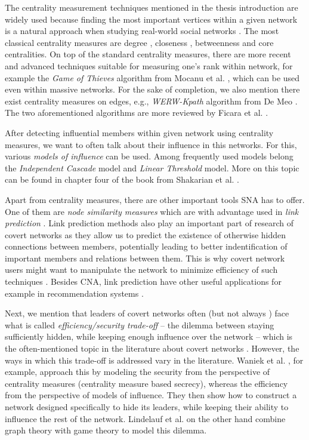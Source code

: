 The centrality measurement techniques mentioned in the thesis introduction are widely used because
finding the most important vertices within a given network is a natural approach when
studying real-world social networks \cite{Crescenzi2016}.
The most classical centrality measures are degree \cite{Shaw1954}, closeness \cite{Beauchamp1965},
betweenness \cite{Anthonisse1971,Freeman1977} and core \cite{Seidman1983} centralities.
On top of the standard centrality measures, there are more recent and advanced techniques suitable for measuring one's rank within network,
for example the \emph{Game of Thieves} algorithm from Mocanu et al. \cite{Mocanu2018}, which can be used even within massive networks.
For the sake of completion, we also mention there exist centrality measures on edges, e.g.,
\emph{WERW-Kpath} algorithm from {De Meo} \cite{DeMeo2013}.
The two aforementioned algorithms are more reviewed by Ficara et al. \cite{Ficara2021}.

After detecting influential members within given network using centrality measures,
we want to often talk about their influence in this networks.
For this, various \emph{models of influence} can be used.
Among frequently used models belong the \emph{Independent Cascade} model and \emph{Linear Threshold} model.
More on this topic can be found in chapter four of the book from Shakarian et al. \cite{Shakarian2015}.

Apart from centrality measures, there are other important tools SNA has to offer.
One of them are \emph{node similarity measures} which are with advantage used in \emph{link prediction} \cite{Zhou2009,Wang2014}.
Link prediction methods also play an important part of research of covert networks
as they allow us to predict the existence of otherwise hidden connections between members, potentially leading to
better indentification of important members and relations between them.
This is why covert network users might want to manipulate the network to minimize efficiency of such techniques \cite{Zhou2019}.
Besides CNA, link prediction have other useful applications for example in recommendation systems \cite{Huang2005,Talasu2017}.

Next, we mention that leaders of covert networks often (but not always \cite{Fatih2012}) face what is called
\emph{efficiency/security trade-off} \cite{Morselli2007} --
the dilemma between staying sufficiently hidden, while keeping enough influence over the network --
which is the often-mentioned topic in the literature about covert networks \cite{Crossley2012,Waniek2017,Lindelauf2009}.
However, the ways in which this trade-off is addressed vary in the literature.
Waniek et al. \cite{Waniek2017}, for example, approach this by modeling the security from the perspective of
centrality measures (centrality measure based secrecy), whereas the efficiency from the perspective of models of influence.
They then show how to construct a network designed specifically to hide its leaders, while
keeping their ability to influence the rest of the network.
Lindelauf et al. \cite{Lindelauf2009} on the other hand combine graph theory with game theory to model this dilemma.

